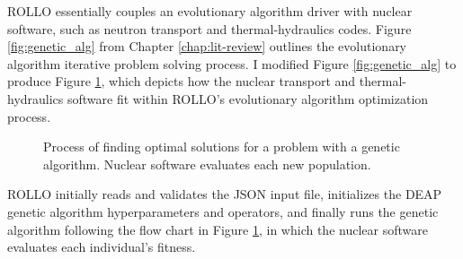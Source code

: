 \gls{ROLLO} essentially couples an evolutionary algorithm driver with nuclear 
software, such as neutron transport and thermal-hydraulics codes. 
Figure \ref{fig:genetic_alg} from Chapter \ref{chap:lit-review} outlines the 
evolutionary algorithm iterative problem solving process. 
I modified Figure \ref{fig:genetic_alg} to produce Figure 
\ref{fig:genetic_alg_nuclear}, which depicts how the nuclear transport and 
thermal-hydraulics software fit within \gls{ROLLO}'s evolutionary algorithm 
optimization process. 
\begin{figure}[]
    \centering
    \caption{Process of finding optimal solutions for a problem with a 
    genetic algorithm. Nuclear software evaluates each new population.}
    \label{fig:genetic_alg_nuclear}
\end{figure}
\gls{ROLLO} initially reads and validates the JSON input 
file, initializes the \gls{DEAP} \cite{fortin_deap_2012} genetic algorithm 
hyperparameters and operators, and finally runs the genetic algorithm following 
the flow chart in Figure \ref{fig:genetic_alg_nuclear}, in which the nuclear 
software evaluates each individual's fitness. 

